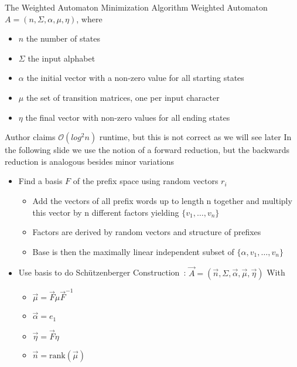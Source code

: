 \documentclass[rgb]{beamer}
\begin{document}
    \begin{frame}[allowframebreaks]{The Weighted Automaton Minimization Algorithm}
        Weighted Automaton $A = \left( n, \Sigma, \alpha, \mu, \eta \right)$, where
        \begin{itemize}
         \item $n$ the number of states
         \item $\Sigma$ the input alphabet
         \item $\alpha$ the initial vector with a non-zero value for all starting states
         \item $\mu$ the set of transition matrices, one per input character
         \item $\eta$ the final vector with non-zero values for all ending states
        \end{itemize}
        \vspace{1cm}
        Author claims $\mathcal{O}(log^2 n)$ runtime, but this is not correct as we will see later
        In the following slide we use the notion of a forward reduction, but the backwards reduction is analogous besides minor variations
        \framebreak
        
        \begin{itemize}
         \item Find a basis $F$ of the prefix space using random vectors $r_i$
         \begin{itemize}
          \item Add the vectors of all prefix words up to length n together and multiply this vector by n different factors yielding $\{v_1, \dots, v_n\}$
          \item Factors are derived by random vectors and structure of prefixes
          \item Base is then the maximally linear independent subset of $\{ \alpha, v_1, \dots, v_n\}$
         \end{itemize}
         \vspace{0.5cm}
         \item Use basis to do Schützenberger Construction~\autocite{schutz}: $\overrightarrow{A} = (\overrightarrow{n}, \Sigma, \overrightarrow{\alpha}, \overrightarrow{\mu}, \overrightarrow{\eta})$
            With
            \begin{itemize}
             \item $\overrightarrow{\mu} = \overrightarrow{F} \mu \overrightarrow{F}^{-1}$
             \item $\overrightarrow{\alpha} = e_1$
             \item $\overrightarrow{\eta} = \overrightarrow{F}\eta$
             \item $\overrightarrow{n} = \text{rank}(\overrightarrow{\mu})$
            \end{itemize}

        \end{itemize}
    \end{frame}
\end{document}
